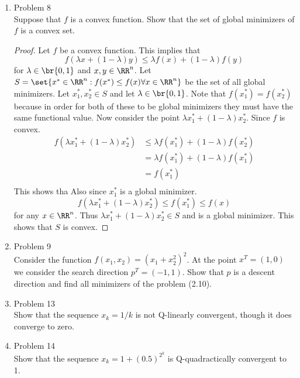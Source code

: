 \documentclass[11pt, oneside]{article}
\begin{document}
\begin{enumerate}
  \item %
    Problem 8 \\
    Suppose that $f$ is a convex function.
    Show that the set of global minimizers of $f$ is a convex set.

    \begin{proof}
      Let $f$ be a convex function.
      This implies that
      \[
        f(\lambda x + (1 - \lambda) y) \le \lambda f(x) + (1 - \lambda) f(y)
      \]
      for $\lambda \in \br{0, 1}$ and $x, y \in \RR^n$.
      Let $S = \set{x^* \in \RR^n : f(x^*) \le f(x) \forall x \in \RR^n}$ be
      the set of all global minimizers.
      Let $x_1^*, x_2^* \in S$ and let $\lambda \in \br{0, 1}$.
      Note that $f(x_1^*) = f(x_2^*)$ because in order for both of these to be
      global minimizers they must have the same functional value.
      Now consider the point $\lambda x_1^* + (1-\lambda)x_2^*$.
      Since $f$ is convex.
      \begin{align*}
        f(\lambda x_1^* + (1-\lambda)x_2^*) &\le \lambda f(x_1^*) + (1 - \lambda) f(x_2^*) \\
        &= \lambda f(x_1^*) + (1 - \lambda) f(x_1^*) \\
        &= f(x_1^*) \\
      \end{align*}
      This shows tha
      Also since $x_1^*$ is a global minimizer.
      \[
        f(\lambda x_1^* + (1-\lambda)x_2^*) \le f(x_1^*) \le f(x)
      \]
      for any $x \in \RR^n$.
      Thus $\lambda x_1^* + (1 - \lambda)x_2^* \in S$ and is a global minimizer.
      This shows that $S$ is convex.
    \end{proof}

  \item %
    Problem 9 \\
    Consider the function $f(x_1, x_2) = (x_1 + x_2^2)^2$.
    At the point $x^T = (1, 0)$ we consider the search direction $p^T = (-1, 1)$.
    Show that $p$ is a descent direction and find all minimizers of the problem
    (2.10).


  \item %
    Problem 13 \\
    Show that the sequence $x_k = 1/k$ is not Q-linearly convergent,
    though it does converge to zero.

  \item %
    Problem 14 \\
    Show that the sequence $x_k = 1 + (0.5)^{2^k}$ is Q-quadractically convergent
    to 1.


\end{enumerate}
\end{document}
